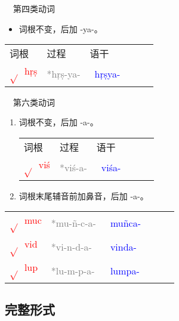 \documentclass[17pt]{beamer}
\newcommand{\skt}[1]{{\sanskritfont{#1}}} %
\newcommand{\verbroot}[1]{\textcolor{red}{$\sqrt{}$#1}}
\newcommand{\sktroot}[1]{{\verbroot{\skt{#1}}}}
\newcommand{\skttransroot}[1]{{\sktroot{#1}~\textcolor{red}{#1}}}
\newcommand{\verbstem}[1]{\textcolor{blue}{#1\nobreakdash-}}
\newcommand{\sktverbstem}[1]{{\textcolor{blue}{\skt{#1\nobreakdash-}}}}
\newcommand{\skttransverbstem}[1]{{\sktverbstem{#1}~\verbstem{#1}}}
\begin{document}
\begin{frame}{\insertsubsection ~~第四类动词}
  \small
  \begin{itemize}
    \item
      词根不变，后加 \nobreakdash-ya\nobreakdash-。
  \end{itemize} 

  \centering
  \begin{tabular}{@{}llllll@{}} %
    词根 & 过程 & 语干  \\
    \skttransroot{hṛṣ} & \textcolor{gray}{*hṛṣ-ya-} & \skttransverbstem{hṛṣya}  \\
  \end{tabular}

\end{frame}

\begin{frame}{\insertsubsection ~~第六类动词}
  \small
  \begin{enumerate}
    \item
      词根不变，后加 \nobreakdash-a\nobreakdash-。

      \begin{tabular}{@{}llllll@{}} %
        词根 & 过程 & 语干  \\
        \skttransroot{viś} & \textcolor{gray}{*viś-a-} & \skttransverbstem{viśa}  \\
      \end{tabular}
   
    \item
      词根末尾辅音前加鼻音，后加 \nobreakdash-a\nobreakdash-。
  \end{enumerate} 

  \centering
  \begin{tabular}{@{}llllll@{}} %
    \skttransroot{muc} & \textcolor{gray}{*mu-ñ-c-a-} & \skttransverbstem{muñca}  \\
    \skttransroot{vid} & \textcolor{gray}{*vi-n-d-a-} & \skttransverbstem{vinda}  \\
    \skttransroot{lup} & \textcolor{gray}{*lu-m-p-a-} & \skttransverbstem{lumpa}  \\
  \end{tabular}

\end{frame}

\subsection{完整形式}
\end{document}
